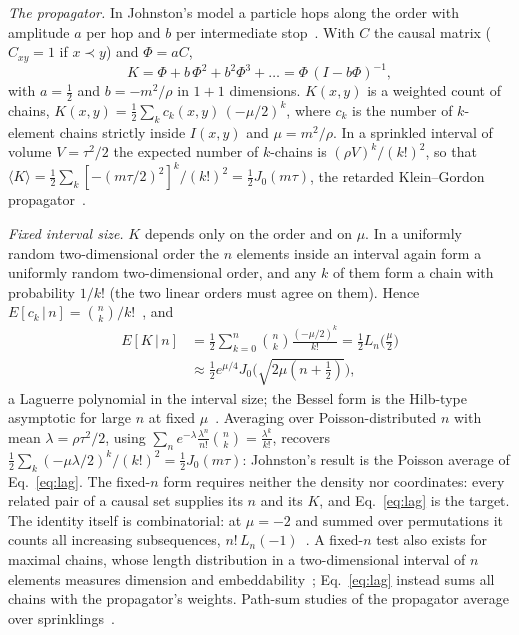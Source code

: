 \documentclass[prd,twocolumn,superscriptaddress,nofootinbib,amsmath,amssymb,floatfix]{revtex4-2}
\begin{document}
\emph{The propagator.} In Johnston's model a particle hops along the order with amplitude $a$ per hop and $b$ per intermediate stop~\cite{Johnston08}. With $C$ the causal matrix ($C_{xy}=1$ if $x\prec y$) and $\Phi=aC$,
\begin{equation}
K=\Phi+b\,\Phi^2+b^2\Phi^3+\dots=\Phi\,(I-b\Phi)^{-1},
\end{equation}
with $a=\tfrac12$ and $b=-m^2/\rho$ in $1+1$ dimensions. $K(x,y)$ is a weighted count of chains, $K(x,y)=\tfrac12\sum_k c_k(x,y)\,(-\mu/2)^k$, where $c_k$ is the number of $k$-element chains strictly inside $I(x,y)$ and $\mu=m^2/\rho$. In a sprinkled interval of volume $V=\tau^2/2$ the expected number of $k$-chains is $(\rho V)^k/(k!)^2$, so that $\langle K\rangle=\tfrac12\sum_k[-(m\tau/2)^2]^k/(k!)^2=\tfrac12J_0(m\tau)$, the retarded Klein--Gordon propagator~\cite{Johnston08}.

\emph{Fixed interval size.} $K$ depends only on the order and on $\mu$. In a uniformly random two-dimensional order the $n$ elements inside an interval again form a uniformly random two-dimensional order, and any $k$ of them form a chain with probability $1/k!$ (the two linear orders must agree on them). Hence $E[c_k\,|\,n]=\binom nk/k!$~\cite{Pinsky06}, and
\begin{equation}
\begin{aligned}
E[K\,|\,n]&=\frac12\sum_{k=0}^n\binom nk\frac{(-\mu/2)^k}{k!}=\frac12L_n\!\Big(\frac\mu2\Big)\\
&\approx\frac12e^{\mu/4}J_0\Big(\sqrt{2\mu(n+\tfrac12)}\Big),
\end{aligned}
\label{eq:lag}
\end{equation}
a Laguerre polynomial in the interval size; the Bessel form is the Hilb-type asymptotic for large $n$ at fixed $\mu$~\cite{Szego39}. Averaging over Poisson-distributed $n$ with mean $\lambda=\rho\tau^2/2$, using $\sum_ne^{-\lambda}\frac{\lambda^n}{n!}\binom nk=\frac{\lambda^k}{k!}$, recovers $\tfrac12\sum_k(-\mu\lambda/2)^k/(k!)^2=\tfrac12J_0(m\tau)$: Johnston's result is the Poisson average of Eq.~\eqref{eq:lag}. The fixed-$n$ form requires neither the density nor coordinates: every related pair of a causal set supplies its $n$ and its $K$, and Eq.~\eqref{eq:lag} is the target. The identity itself is combinatorial: at $\mu=-2$ and summed over permutations it counts all increasing subsequences, $n!\,L_n(-1)$~\cite{LifschitzPittel81,OEIS}. A fixed-$n$ test also exists for maximal chains, whose length distribution in a two-dimensional interval of $n$ elements measures dimension and embeddability~\cite{ABP18}; Eq.~\eqref{eq:lag} instead sums all chains with the propagator's weights. Path-sum studies of the propagator average over sprinklings~\cite{Shuman23,KastratiHinrichsen26}.
\end{document}
